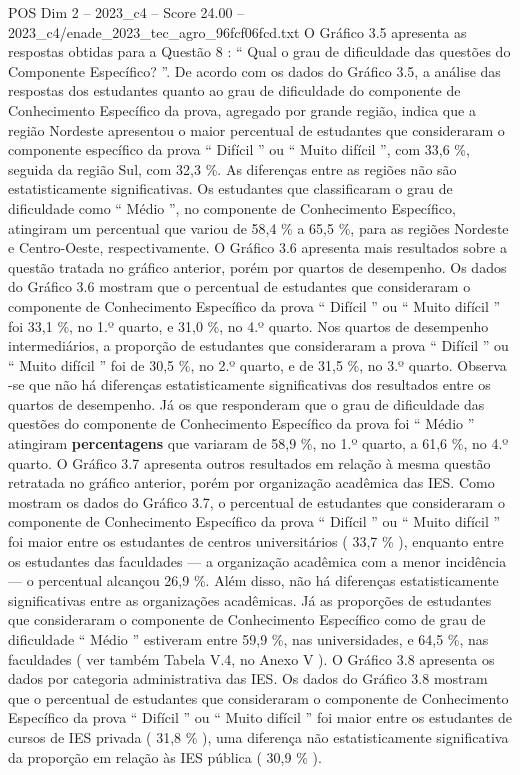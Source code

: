 \begin{textsample}{POS Dim 2 – 2023\_c4 – Score 24.00 – 2023\_c4/enade\_2023\_tec\_agro\_96fcf06fcd.txt}
O Gráfico 3.5 apresenta as respostas obtidas para a Questão 8 : “ Qual o grau de dificuldade das questões do Componente Específico? ”.
De acordo com os dados do Gráfico 3.5, a análise das respostas dos estudantes quanto ao grau de dificuldade do componente de Conhecimento Específico da prova, agregado por grande região, indica que a região Nordeste apresentou o maior percentual de estudantes que consideraram o componente específico da prova “ Difícil ” ou “ Muito difícil ”, com 33,6 \%, seguida da região Sul, com 32,3 \%.
As diferenças entre as regiões não são estatisticamente significativas.
Os estudantes que classificaram o grau de dificuldade como “ Médio ”, no componente de Conhecimento Específico, atingiram um percentual que variou de 58,4 \% a 65,5 \%, para as regiões Nordeste e Centro-Oeste, respectivamente.
O Gráfico 3.6 apresenta mais resultados sobre a questão tratada no gráfico anterior, porém por quartos de desempenho.
Os dados do Gráfico 3.6 mostram que o percentual de estudantes que consideraram o componente de Conhecimento Específico da prova “ Difícil ” ou “ Muito difícil ” foi 33,1 \%, no 1.º quarto, e 31,0 \%, no 4.º quarto.
Nos quartos de desempenho intermediários, a proporção de estudantes que consideraram a prova “ Difícil ” ou “ Muito difícil ” foi de 30,5 \%, no 2.º quarto, e de 31,5 \%, no 3.º quarto.
Observa -se que não há diferenças estatisticamente significativas dos resultados entre os quartos de desempenho.
Já os que responderam que o grau de dificuldade das questões do componente de Conhecimento Específico da prova foi “ Médio ” atingiram \textbf{percentagens} que variaram de 58,9 \%, no 1.º quarto, a 61,6 \%, no 4.º quarto.
O Gráfico 3.7 apresenta outros resultados em relação à mesma questão retratada no gráfico anterior, porém por organização acadêmica das IES.
Como mostram os dados do Gráfico 3.7, o percentual de estudantes que consideraram o componente de Conhecimento Específico da prova “ Difícil ” ou “ Muito difícil ” foi maior entre os estudantes de centros universitários ( 33,7 \% ), enquanto entre os estudantes das faculdades — a organização acadêmica com a menor incidência — o percentual alcançou 26,9 \%.
Além disso, não há diferenças estatisticamente significativas entre as organizações acadêmicas.
Já as proporções de estudantes que consideraram o componente de Conhecimento Específico como de grau de dificuldade “ Médio ” estiveram entre 59,9 \%, nas universidades, e 64,5 \%, nas faculdades ( ver também Tabela V.4, no Anexo V ).
O Gráfico 3.8 apresenta os dados por categoria administrativa das IES.
Os dados do Gráfico 3.8 mostram que o percentual de estudantes que consideraram o componente de Conhecimento Específico da prova “ Difícil ” ou “ Muito difícil ” foi maior entre os estudantes de cursos de IES privada ( 31,8 \% ), uma diferença não estatisticamente significativa da proporção em relação às IES pública ( 30,9 \% ).

\end{textsample}
